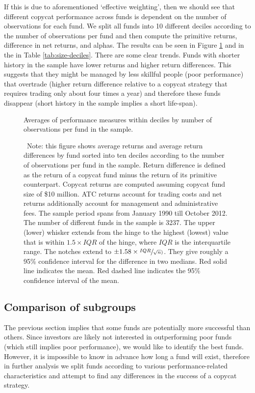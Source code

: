 \documentclass[12pt, a4]{article}
\begin{document}
If this is due to aforementioned `effective weighting', then we should see that different copycat performance across funds is dependent on the number of observations for each fund. We split all funds into 10 different deciles according to the number of observations per fund and then compute the primitive returns, difference in net returns, and alphas. The results can be seen in Figure \ref{fig:size-deciles} and in the  in Table \ref{tab:size-deciles}. There are some clear trends. Funds with shorter history in the sample have lower returns and higher return differences. This suggests that they might be managed by less skillful people (poor performance) that overtrade (higher return difference relative to a copycat strategy that requires trading only about four times a year) and therefore these funds disappear (short history in the sample implies a short life-span).

\begin{figure}
	\centering
	\caption{Averages of performance measures within deciles by number of observations per fund in the sample.}
	\label{fig:size-deciles}

	

	\caption*{\scriptsize ~Note: this figure shows average returns and average return differences by fund sorted into ten deciles according to the number of observations per fund in the sample. Return difference is defined as the return of a copycat fund minus the return of its primitive counterpart. Copycat returns are computed assuming copycat fund size of \$10 million. \textsc{ATC} returns account for trading costs and net returns additionally account for management and administrative fees. The sample period spans from January 1990 till October 2012. The number of different funds in the sample is 3237. The upper (lower) whisker extends from the hinge to the highest (lowest) value that is within $1.5 \times IQR$ of the hinge, where $IQR$ is the interquartile range. The notches extend to $\pm 1.58 \times \sfrac{IQR}{\sqrt{n})}$. They give roughly a 95\% confidence interval for the difference in two medians. Red solid line indicates the mean. Red dashed line indicates the 95\% confidence interval of the mean.}
\end{figure}

\subsection{Comparison of subgroups}
The previous section implies that some funds are potentially more successful than others. Since investors are likely not interested in outperforming poor funds (which still implies poor performance), we would like to identify the best funds. However, it is impossible to know in advance how long a fund will exist, therefore in further analysis we split funds according to various performance-related characteristics and attempt to find any differences in the success of a copycat strategy.
\end{document}
